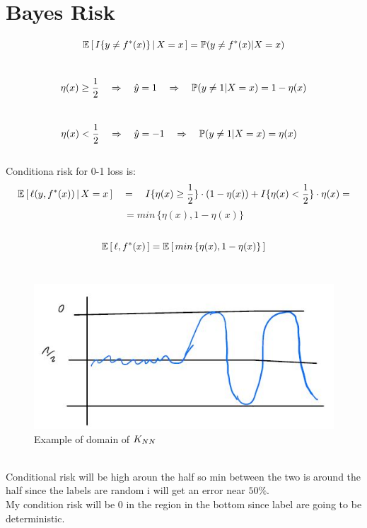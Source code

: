 \documentclass[../main.tex]{subfiles}
\begin{document}
\section{Bayes Risk}

$$
\mathbb{E} \left[ \, I \{ y \neq f^*(x) \}\, | \, X = x \, \right] = \mathbb{P}(y \neq f^*(x)|X= x)
$$\
$$
\eta(x) \geq \frac{1}{2} \quad \Rightarrow \quad \hat{y} = 1  \quad \Rightarrow \quad  \mathbb{P} (y \neq 1 | X= x) = 1-\eta(x)
$$\
$$
\eta(x) < \frac{1}{2} \quad \Rightarrow \quad \hat{y} = -1  \quad \Rightarrow \quad  \mathbb{P} (y \neq 1 | X= x) = \eta(x) \quad
$$
\\
Conditiona risk for 0-1 loss is:
\\
$$
\mathbb{E} \left[ \, \ell (y, f^*(x)) \, | \, X = x \, \right] 
\quad = \quad I \{ \eta(x) \geq \frac{1}{2}\} \cdot(1-\eta(x)) + I \{ \eta(x) <\frac{1}{2}\} \cdot \eta(x) = 
$$
$$
 = min \, \{ \eta(x), 1- \eta(x) \}
$$\
$$
\mathbb{E} \left[ \, \ell , f^*(x) \, \right] = \mathbb{E} \left[ \, min \, \{ \eta(x) , 1- \eta(x) \} \, \right] 
$$
\\
\begin{figure}[h]
    \centering
    \includegraphics[width=0.7\linewidth]{../img/lez6-img4.JPG}
    \caption{Example of domain of $K_{NN}$}
\end{figure}
\\
Conditional risk will be high aroun the half so min between the two is around
the half since the labels are random i will get an error near $50\%$.\\
My condition risk will be 0 in the region in the bottom since label are going to
be deterministic.
\end{document}
